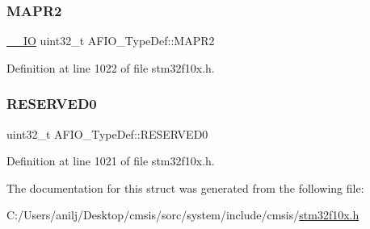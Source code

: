 \subsubsection{\texorpdfstring{M\+A\+P\+R2}{MAPR2}}
{\footnotesize\ttfamily \hyperlink{core__sc300_8h_aec43007d9998a0a0e01faede4133d6be}{\+\_\+\+\_\+\+IO} uint32\+\_\+t A\+F\+I\+O\+\_\+\+Type\+Def\+::\+M\+A\+P\+R2}



Definition at line 1022 of file stm32f10x.\+h.

\mbox{\label{struct_a_f_i_o___type_def_a6cf52816787797115664f0c8167a92b9}} 
\subsubsection{\texorpdfstring{R\+E\+S\+E\+R\+V\+E\+D0}{RESERVED0}}
{\footnotesize\ttfamily uint32\+\_\+t A\+F\+I\+O\+\_\+\+Type\+Def\+::\+R\+E\+S\+E\+R\+V\+E\+D0}



Definition at line 1021 of file stm32f10x.\+h.



The documentation for this struct was generated from the following file\+:\begin{DoxyCompactItemize}
\item 
C\+:/\+Users/anilj/\+Desktop/cmsis/sorc/system/include/cmsis/\hyperlink{stm32f10x_8h}{stm32f10x.\+h}\end{DoxyCompactItemize}
